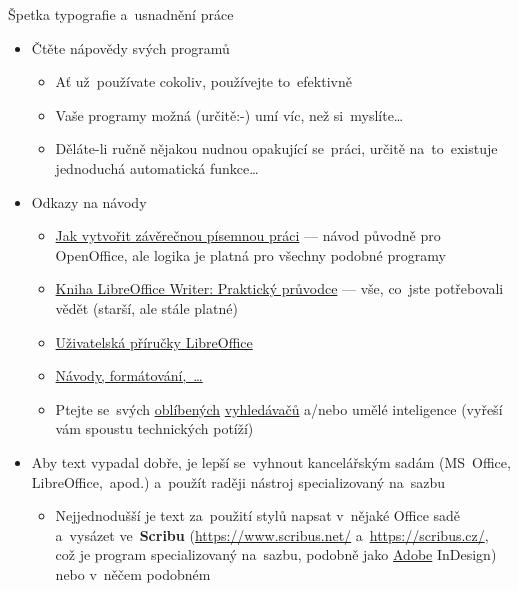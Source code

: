 \documentclass[compress, xelatex, 11pt, xcolor=svgnames, aspectratio=169,
	hyperref={
		bookmarks=true,
		unicode=true,
		colorlinks=true,
		pdftitle={Citacni software},
		plainpages=false,
		pdfauthor={Vojtech Zeisek},
		pdfsubject={Kratky uvod do citacniho software},
		pdfcreator={XeLaTeX},
		pdfkeywords={citace, reference, software, literatura},
		linkcolor=Crimson, %
		anchorcolor=Magenta, %
		citecolor=Magenta, %
		filecolor=Magenta, %
		menucolor=Magenta, %
		urlcolor=DarkTurquoise, %
		},
	url={hyphens, lowtilde} %
	]{beamer}
\begin{document}
\begin{frame}[allowframebreaks]{Špetka typografie a~usnadnění práce}
\begin{itemize}
		\begin{itemize}
			\item \href{https://cs.wikipedia.org/wiki/Typografie}{Typografie} (grafická úprava textu) slouží k~tomu, aby~se~text dobře (pohodlně) četl (a~zároveň dobře vypadal)
			\item V~odborném textu sjednocuje styl psaní např. jednotek, odborných jmen \textit{kurzívou} apod., což~usnadňuje orientaci v~textu a~odstraňuje nejasnosti při čtení
			\item Pro angličtinu viz např. \href{https://authorservices.wiley.com/author-resources/book-authors/prepare-your-manuscript/house-style.html}{Wiley House Style}
		\end{itemize}
		\item Čtěte nápovědy svých programů
			\begin{itemize}
				\item Ať už~používate cokoliv, používejte to~efektivně
				\item Vaše programy možná (určitě:-) umí víc, než si~myslíte\ldots
				\item Děláte-li ručně nějakou nudnou opakující se~práci, určitě na~to~existuje jednoduchá automatická funkce\ldots
			\end{itemize}
		\item Odkazy na návody
			\begin{itemize}
				\item \href{https://www.linuxexpres.cz/kancelar/jak-vytvorit-zaverecnou-pisemnou-praci}{Jak vytvořit závěrečnou písemnou práci} --- návod původně pro OpenOffice, ale logika je platná pro všechny podobné programy
				\item \href{https://www.root.cz/knihy/libreoffice-writer-prakticky-pruvodce/}{Kniha LibreOffice Writer: Praktický průvodce} --- vše, co~jste potřebovali vědět (starší, ale stále platné)
				\item \href{https://cs.libreoffice.org/get-help/documentation/}{Uživatelská příručky LibreOffice}
				\item \href{https://formatovani-dokumentu.cz/navody}{Návody, formátování,~\ldots}
				\item Ptejte se~svých \href{https://www.startpage.com/}{oblíbených} \href{https://duckduckgo.com/}{vyhledávačů} a/nebo umělé inteligence (vyřeší vám spoustu technických potíží)
			\end{itemize}
		\item Aby text vypadal dobře, je lepší se~vyhnout kancelářským sadám (MS~Office, LibreOffice,~apod.) a~použít raději nástroj specializovaný na~sazbu
			\begin{itemize}
				\item Nejjednodušší je text za~použití stylů napsat v~nějaké Office sadě a~vysázet ve~\textbf{Scribu} (\url{https://www.scribus.net/} a~\url{https://scribus.cz/}, což je program specializovaný na~sazbu, podobně jako \href{https://www.natur.cuni.cz/fakulta/cit/podpora-uzivatelu/softwarove-licence/adobe}{Adobe} InDesign) nebo v~něčem podobném
			\end{itemize}
	\end{itemize}
\end{frame}
\end{document}
